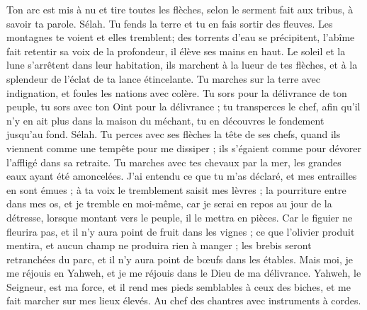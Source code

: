\begin{multicols}{2}
Ton arc est mis à nu et tire toutes les flèches, selon le serment fait aux tribus, à savoir ta parole. Sélah. Tu fends la terre et tu en fais sortir des fleuves.
Les montagnes te voient et elles tremblent; des torrents d’eau se précipitent, l'abîme fait retentir sa voix de la profondeur, il élève ses mains en haut.
Le soleil et la lune s'arrêtent dans leur habitation, ils marchent à la lueur de tes flèches, et à la splendeur de l'éclat de ta lance étincelante.
Tu marches sur la terre avec indignation, et foules les nations avec colère.
Tu sors pour la délivrance de ton peuple, tu sors avec ton Oint pour la délivrance ; tu transperces le chef, afin qu'il n'y en ait plus dans la maison du méchant, tu en découvres le fondement  jusqu’au fond. Sélah.
Tu perces avec ses flèches  la tête de ses chefs, quand ils viennent comme une tempête pour me dissiper ; ils s'égaient comme pour dévorer l'affligé dans sa retraite.
Tu marches avec tes chevaux par la mer, les grandes eaux ayant été amoncelées.
J'ai entendu ce que tu m'as déclaré, et mes entrailles en sont émues ; à ta voix le tremblement saisit mes lèvres ; la pourriture entre dans mes os, et je tremble en moi-même, car je serai en repos au jour de la détresse, lorsque montant vers le peuple, il le mettra en pièces.
Car le figuier ne fleurira pas, et il n'y aura point de fruit dans les vignes ; ce que l'olivier produit mentira, et aucun champ ne produira rien à manger ; les brebis seront retranchées du parc, et il n'y aura point de bœufs dans les étables.
Mais moi, je me réjouis en Yahweh, et je me réjouis dans le Dieu de ma délivrance.
Yahweh, le Seigneur, est ma force, et il rend mes pieds semblables à ceux des biches, et me fait marcher sur mes lieux élevés. Au chef des chantres avec instruments à cordes.
\PPE{}
\end{multicols}
